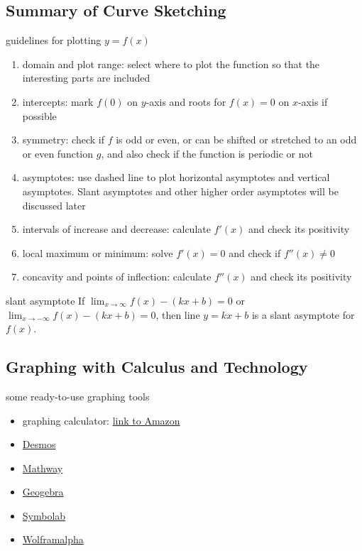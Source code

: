 \documentclass[Calculus 1 Recitation.tex]{subfiles}
\begin{document}
\subsection{Summary of Curve Sketching}
\begin{myleftlinebox}
	guidelines for plotting $y=f(x)$
	\tcblower
	\begin{enumerate}
		\item domain and plot range: select where to plot the function so that the interesting parts are included
		\item intercepts: mark $f(0)$ on $y$-axis and roots for $f(x)=0$ on $x$-axis if possible
		\item symmetry: check if $f$ is odd or even, or can be shifted or stretched to an odd or even function $g$, and also check if the function is periodic or not
		\item asymptotes: use dashed line to plot horizontal asymptotes and vertical asymptotes. Slant asymptotes and other higher order asymptotes will be discussed later
		\item intervals of increase and decrease: calculate $f'(x)$ and check its positivity
		\item local maximum or minimum: solve $f'(x)=0$ and check if $f''(x)\neq 0$
		\item concavity and points of inflection: calculate $f''(x)$ and check its positivity
	\end{enumerate}
\end{myleftlinebox}

\begin{myleftlinebox}
	slant asymptote
	\tcblower
	If $\lim_{x\to\infty} f(x)-(kx+b)=0$ or $\lim_{x\to-\infty} f(x)-(kx+b)=0$, then line $y=kx+b$ is a slant asymptote for $f(x)$.
\end{myleftlinebox}

\subsection{Graphing with Calculus and Technology}
\begin{myleftlinebox}
	some ready-to-use graphing tools
	\tcblower
	\begin{itemize}
		\item graphing calculator: \href{https://www.amazon.com/s?k=graphing+calculator}{link to Amazon}
		\item \href{https://www.desmos.com/calculator}{Desmos}
		\item \href{https://www.mathway.com/Graph}{Mathway}
		\item \href{https://www.geogebra.org/graphing}{Geogebra}
		\item \href{https://www.symbolab.com/graphing-calculator}{Symbolab}
		\item \href{https://www.wolframalpha.com/}{Wolframalpha}
	\end{itemize}
\end{myleftlinebox}
\end{document}
